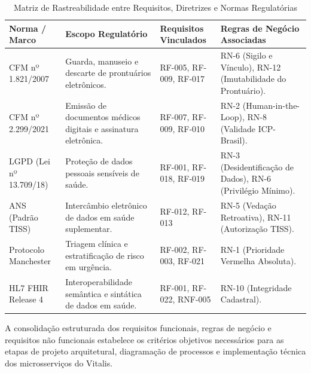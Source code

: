 \begin{table}[H]
\centering
\small
\caption{Matriz de Rastreabilidade entre Requisitos, Diretrizes e Normas Regulatórias}
\label{tab:rastreabilidade_vitalis}
\begin{tabularx}{\textwidth}{>{\raggedright\arraybackslash}p{2.6cm} >{\raggedright\arraybackslash}p{3.5cm} >{\raggedright\arraybackslash}p{3.5cm} >{\raggedright\arraybackslash}X}
\toprule
\textbf{Norma / Marco} & \textbf{Escopo Regulatório} & \textbf{Requisitos Vinculados} & \textbf{Regras de Negócio Associadas} \\
\midrule
CFM nº 1.821/2007 & Guarda, manuseio e descarte de prontuários eletrônicos. & RF-005, RF-009, RF-017 & RN-6 (Sigilo e Vínculo), RN-12 (Imutabilidade do Prontuário). \\
\addlinespace
CFM nº 2.299/2021 & Emissão de documentos médicos digitais e assinatura eletrônica. & RF-007, RF-009, RF-010 & RN-2 (Human-in-the-Loop), RN-8 (Validade ICP-Brasil). \\
\addlinespace
LGPD (Lei nº 13.709/18) & Proteção de dados pessoais sensíveis de saúde. & RF-001, RF-018, RF-019 & RN-3 (Desidentificação de Dados), RN-6 (Privilégio Mínimo). \\
\addlinespace
ANS (Padrão TISS) & Intercâmbio eletrônico de dados em saúde suplementar. & RF-012, RF-013 & RN-5 (Vedação Retroativa), RN-11 (Autorização TISS). \\
\addlinespace
Protocolo Manchester & Triagem clínica e estratificação de risco em urgência. & RF-002, RF-003, RF-021 & RN-1 (Prioridade Vermelha Absoluta). \\
\addlinespace
HL7 FHIR Release 4 & Interoperabilidade semântica e sintática de dados em saúde. & RF-001, RF-022, RNF-005 & RN-10 (Integridade Cadastral). \\
\bottomrule
\end{tabularx}
\end{table}

A consolidação estruturada dos requisitos funcionais, regras de negócio e requisitos não funcionais estabelece os critérios objetivos necessários para as etapas de projeto arquitetural, diagramação de processos e implementação técnica dos microsserviços do Vitalis.
